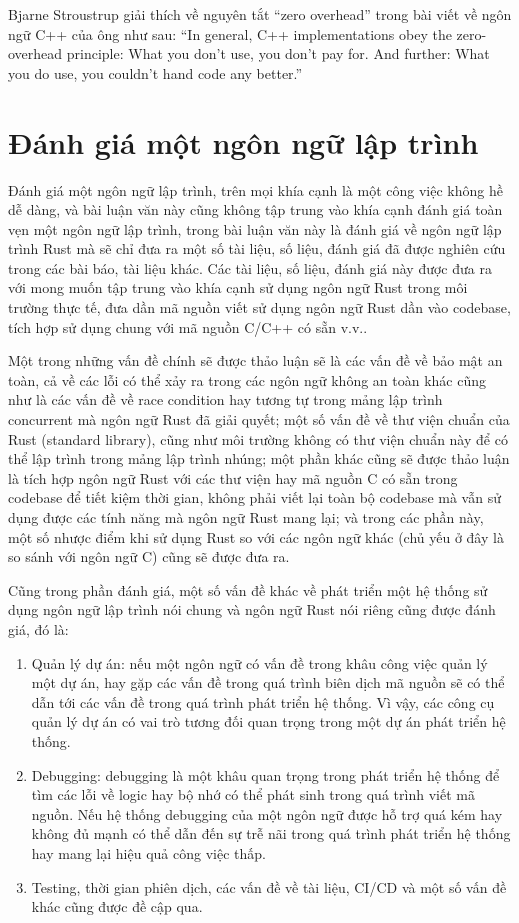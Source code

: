 Bjarne Stroustrup giải thích về nguyên tắt ``zero overhead'' trong bài viết về ngôn ngữ C++ của ông như sau: ``In general, C++ implementations obey the zero-overhead principle: What you don’t use, you don’t pay for. And further: What you do use, you couldn’t hand code any better.''


\section{Đánh giá một ngôn ngữ lập trình}
Đánh giá một ngôn ngữ lập trình, trên mọi khía cạnh là một công việc không hề dễ dàng, và bài luận văn này cũng không tập trung vào khía cạnh đánh giá toàn vẹn một ngôn ngữ lập trình, trong bài luận văn này là đánh giá về ngôn ngữ lập trình Rust mà sẽ chỉ đưa ra một số tài liệu, số liệu, đánh giá đã được nghiên cứu trong các bài báo, tài liệu khác.
Các tài liệu, số liệu, đánh giá này được đưa ra với mong muốn tập trung vào khía cạnh sử dụng ngôn ngữ Rust trong môi trường thực tế, đưa dần mã nguồn viết sử dụng ngôn ngữ Rust dần vào codebase, tích hợp sử dụng chung với mã nguồn C/C++ có sẵn v.v..

Một trong những vấn đề chính sẽ được thảo luận sẽ là các vấn đề về bảo mật an toàn, cả về các lỗi có thể xảy ra trong các ngôn ngữ không an toàn khác cũng như là các vấn đề về race condition hay tương tự trong mảng lập trình concurrent mà ngôn ngữ Rust đã giải quyết; một số vấn đề về thư viện chuẩn của Rust (standard library), cũng như môi trường không có thư viện chuẩn này để có thể lập trình trong mảng lập trình nhúng; một phần khác cũng sẽ được thảo luận là tích hợp ngôn ngữ Rust với các thư viện hay mã nguồn C có sẵn trong codebase để tiết kiệm thời gian, không phải viết lại toàn bộ codebase mà vẫn sử dụng được các tính năng mà ngôn ngữ Rust mang lại; và trong các phần này, một số nhược điểm khi sử dụng Rust so với các ngôn ngữ khác (chủ yếu ở đây là so sánh với ngôn ngữ C) cũng sẽ được đưa ra.

Cũng trong phần đánh giá, một số vấn đề khác về phát triển một hệ thống sử dụng ngôn ngữ lập trình nói chung và ngôn ngữ Rust nói riêng cũng được đánh giá, đó là:

\begin{enumerate}
    \item Quản lý dự án: nếu một ngôn ngữ có vấn đề trong khâu công việc quản lý một dự án, hay gặp các vấn đề trong quá trình biên dịch mã nguồn sẽ có thể dẫn tới các vấn đề trong quá trình phát triển hệ thống. Vì vậy, các công cụ quản lý dự án có vai trò tương đối quan trọng trong một dự án phát triển hệ thống.

    \item Debugging: debugging là một khâu quan trọng trong phát triển hệ thống để tìm các lỗi về logic hay bộ nhớ có thể phát sinh trong quá trình viết mã nguồn.
Nếu hệ thống debugging của một ngôn ngữ được hỗ trợ quá kém hay không đủ mạnh có thể dẫn đến sự trễ nãi trong quá trình phát triển hệ thống hay mang lại hiệu quả công việc thấp.

    \item Testing, thời gian phiên dịch, các vấn đề về tài liệu, CI/CD và một số vấn đề khác cũng được đề cập qua.
\end{enumerate}

